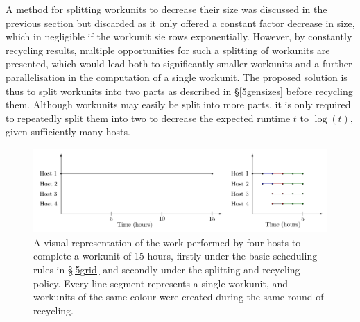 A method for splitting workunits to decrease their size was discussed in the previous section but discarded as it only offered  a constant factor decrease in size, which in negligible if the workunit sie rows exponentially. However, by constantly recycling results, multiple opportunities for such  a  splitting of workunits are presented, which would lead both to significantly smaller workunits and a further parallelisation in the computation of a single workunit. 
The proposed solution is thus to split workunits into two parts as described in \S\ref{5gensizes} before recycling them. Although workunits may easily be split into more parts, it is only required to repeatedly split them into two to decrease the expected runtime $t$ to $\log(t)$, given sufficiently many hosts.
\begin{figure}[b]
\centering
\includegraphics[width=15.5cm]{images/splits}
\caption{A visual representation of the work performed by four hosts to complete a workunit of 15 hours, firstly under the basic scheduling rules in \S\ref{5grid} and secondly under the splitting and recycling policy. Every line segment represents a single workunit, and workunits of the same colour were created during the same round of recycling.} \label{fig:splits}
\end{figure}

